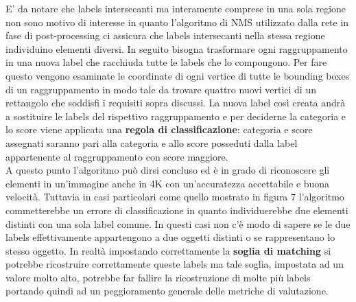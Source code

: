 E' da notare che labels intersecanti ma interamente comprese in una sola regione non sono motivo di interesse in quanto l'algoritmo di NMS utilizzato dalla rete in fase di post-processing ci assicura che labels intersecanti nella stessa regione individuino elementi diversi.
In seguito bisogna trasformare ogni raggruppamento in una nuova label che racchiuda tutte le labels che lo compongono. Per fare questo vengono esaminate le coordinate di ogni vertice di tutte le bounding boxes di un raggruppamento in modo tale da trovare quattro nuovi vertici di un rettangolo che soddisfi i requisiti sopra discussi. La nuova label così creata andrà a sostituire le labels del rispettivo raggruppamento e per deciderne la categoria e lo score viene applicata una \textbf{regola di classificazione}: categoria e score assegnati saranno pari alla categoria e allo score posseduti dalla label appartenente al raggruppamento con score maggiore.\\
A questo punto l'algoritmo può dirsi concluso ed è in grado di riconoscere gli elementi in un'immagine anche in 4K con un'accuratezza accettabile e buona velocità. Tuttavia in casi particolari come quello mostrato in figura 7 l'algoritmo commetterebbe un errore di classificazione in quanto individuerebbe due elementi distinti con una sola label comune. In questi casi non c'è modo di sapere se le due labels effettivamente appartengono a due oggetti distinti o se rappresentano lo stesso oggetto. In realtà impostando correttamente la \textbf{soglia di matching} si potrebbe ricostruire correttamente queste labels ma tale soglia, impostata ad un valore molto alto, potrebbe far fallire la ricostruzione di molte più labels portando quindi ad un peggioramento generale delle metriche di valutazione. 
